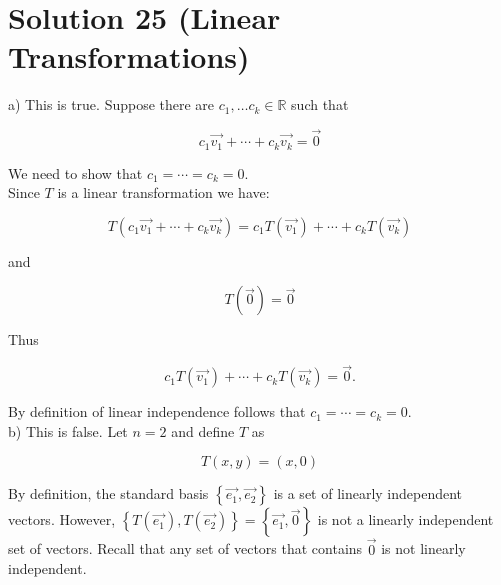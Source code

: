 \documentclass[10pt]{article}
\begin{document}
\section*{Solution 25 (Linear Transformations)}
a) This is true. Suppose there are $c_{1}, \ldots c_{k} \in \mathbb{R}$ such that

$$
c_{1} \overrightarrow{v_{1}}+\cdots+c_{k} \overrightarrow{v_{k}}=\overrightarrow{0}
$$

We need to show that $c_{1}=\cdots=c_{k}=0$.\\
Since $T$ is a linear transformation we have:

$$
T\left(c_{1} \overrightarrow{v_{1}}+\cdots+c_{k} \overrightarrow{v_{k}}\right)=c_{1} T\left(\overrightarrow{v_{1}}\right)+\cdots+c_{k} T\left(\overrightarrow{v_{k}}\right)
$$

and

$$
T(\overrightarrow{0})=\overrightarrow{0}
$$

Thus

$$
c_{1} T\left(\overrightarrow{v_{1}}\right)+\cdots+c_{k} T\left(\overrightarrow{v_{k}}\right)=\overrightarrow{0} .
$$

By definition of linear independence follows that $c_{1}=\cdots=c_{k}=0$.\\
b) This is false. Let $n=2$ and define $T$ as

$$
T(x, y)=(x, 0)
$$

By definition, the standard basis $\left\{\overrightarrow{e_{1}}, \overrightarrow{e_{2}}\right\}$ is a set of linearly independent vectors. However, $\left\{T\left(\overrightarrow{e_{1}}\right), T\left(\overrightarrow{e_{2}}\right)\right\}=\left\{\overrightarrow{e_{1}}, \overrightarrow{0}\right\}$ is not a linearly independent set of vectors. Recall that any set of vectors that contains $\overrightarrow{0}$ is not linearly independent.
\end{document}
